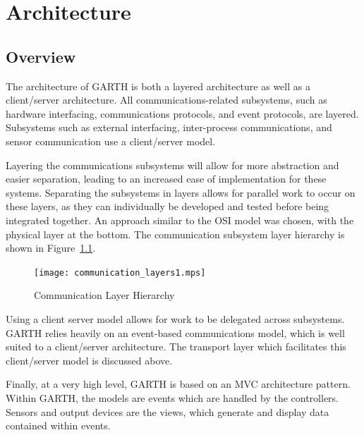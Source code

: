 \documentclass{report}
\begin{document}

\chapter{Architecture} %
\label{ch:architecture}

\section{Overview}

The architecture of GARTH is both a layered architecture as well as a
client/server architecture. All communications-related subsystems, such as
hardware interfacing, communications protocols, and event protocols, are
layered. Subsystems such as external interfacing, inter-process communications,
and sensor communication use a client/server model.

Layering the communications subsystems will allow for more abstraction and
easier separation, leading to an increased ease of implementation for these
systems. Separating the subsystems in layers allows for parallel work to occur
on these layers, as they can individually be developed and tested before being
integrated together. An approach similar to the OSI model was chosen, with the
physical layer at the bottom. The communication subsystem layer hierarchy is
shown in Figure~\ref{fig:communication_layers}.

\begin{figure}[hp]
    \centering
        \caption{Communication Layer Hierarchy}
        \scriptsize
        \setlength{\unitlength}{2.0em}
        \texttt{[image: communication\_layers1.mps]}
        \normalsize
    \label{fig:communication_layers}
\end{figure}

Using a client server model allows for work to be delegated across
subsystems. GARTH relies heavily on an event-based communications model, which
is well suited to a client/server architecture. The transport layer which
facilitates this client/server model is discussed above.

Finally, at a very high level, GARTH is based on an MVC architecture pattern.
Within GARTH, the models are events which are handled by the controllers. Sensors
and output devices are the views, which generate and display data contained within
events.
\end{document}
